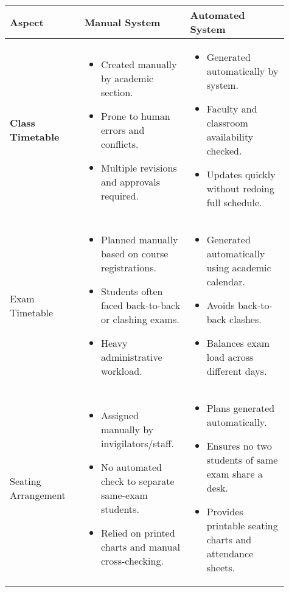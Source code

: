 \documentclass[12pt]{article}
\begin{document}
\begin{longtable}{|>{\bfseries}m{0.25\linewidth}|m{0.33\linewidth}|m{0.33\linewidth}|}
\hline
\textbf{Aspect} & \textbf{Manual System} & \textbf{Automated System} \\
\hline

Class Timetable &
\begin{itemize}
    \item Created manually by academic section.  
    \item Prone to human errors and conflicts.  
    \item Multiple revisions and approvals required.  
\end{itemize} &
\begin{itemize}
    \item Generated automatically by system.  
    \item Faculty and classroom availability checked.  
    \item Updates quickly without redoing full schedule.  
\end{itemize} \\
\hline

Exam Timetable &
\begin{itemize}
    \item Planned manually based on course registrations.  
    \item Students often faced back-to-back or clashing exams.  
    \item Heavy administrative workload.  
\end{itemize} &
\begin{itemize}
    \item Generated automatically using academic calendar.  
    \item Avoids back-to-back clashes.  
    \item Balances exam load across different days.  
\end{itemize} \\
\hline

Seating Arrangement &
\begin{itemize}
    \item Assigned manually by invigilators/staff.  
    \item No automated check to separate same-exam students.  
    \item Relied on printed charts and manual cross-checking.  
\end{itemize} &
\begin{itemize}
    \item Plans generated automatically.  
    \item Ensures no two students of same exam share a desk.  
    \item Provides printable seating charts and attendance sheets.  
\end{itemize} \\
\hline


\end{longtable}
\end{document}

